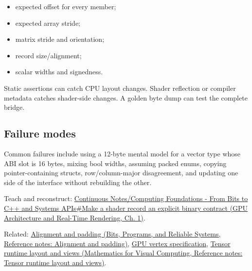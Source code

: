 \begin{itemize}
\tightlist
\item
  expected offset for every member;
\item
  expected array stride;
\item
  matrix stride and orientation;
\item
  record size/alignment;
\item
  scalar widths and signedness.
\end{itemize}

Static assertions can catch CPU layout changes. Shader reflection or compiler metadata catches shader-side changes. A golden byte dump can test the complete bridge.

\subsection{Failure modes}\label{appendix-749048795dbb-failure-modes}

\hypertarget{appendix-749048795dbb-failure-modes}{}

Common failures include using a 12-byte mental model for a vector type whose ABI slot is 16 bytes, mixing bool widths, assuming packed enums, copying pointer-containing structs, row/column-major disagreement, and updating one side of the interface without rebuilding the other.

Teach and reconstruct: \href{../06-GPU-Architecture-and-Real-Time-Rendering/main.pdf\#nameddest=01-foundations-i-ch008-make-a-shader-record-an-explicit-binary-contract}{Continuous Notes/Computing Foundations - From Bits to C++ and Systems APIs\#Make a shader record an explicit binary contract (GPU Architecture and Real-Time Rendering, Ch. 1)}.

Related: \href{../01-Bits-Programs-and-Reliable-Systems/main.pdf\#nameddest=appendix-a1f7c53b4742}{Alignment and padding (Bits, Programs, and Reliable Systems, Reference notes: Alignment and padding)}, \hyperref[appendix-749ba51a6c25]{GPU vertex specification}, \href{../02-Mathematics-for-Visual-Computing/main.pdf\#nameddest=appendix-cebadf3106d1}{Tensor runtime layout and views (Mathematics for Visual Computing, Reference notes: Tensor runtime layout and views)}.
